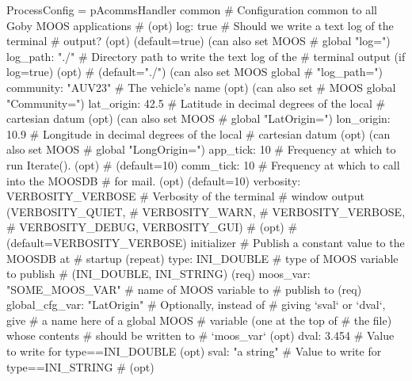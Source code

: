 \documentclass[11pt, letterpaper, oneside]{memoir}
\begin{document}
\begin{boxedverbatim}
ProcessConfig = pAcommsHandler
{
  common {  # Configuration common to all Goby MOOS applications 
            # (opt)
    log: true  # Should we write a text log of the terminal 
               # output? (opt) (default=true) (can also set MOOS 
               # global "log=")
    log_path: "./"  # Directory path to write the text log of the 
                    # terminal output (if log=true) (opt) 
                    # (default="./") (can also set MOOS global 
                    # "log_path=")
    community: "AUV23"  # The vehicle's name (opt) (can also set 
                        # MOOS global "Community=")
    lat_origin: 42.5  # Latitude in decimal degrees of the local 
                      # cartesian datum (opt) (can also set MOOS 
                      # global "LatOrigin=")
    lon_origin: 10.9  # Longitude in decimal degrees of the local 
                      # cartesian datum (opt) (can also set MOOS 
                      # global "LongOrigin=")
    app_tick: 10  # Frequency at which to run Iterate(). (opt) 
                  # (default=10)
    comm_tick: 10  # Frequency at which to call into the MOOSDB 
                   # for mail. (opt) (default=10)
    verbosity: VERBOSITY_VERBOSE  # Verbosity of the terminal 
                                  # window output (VERBOSITY_QUIET, 
                                  # VERBOSITY_WARN, 
                                  # VERBOSITY_VERBOSE, 
                                  # VERBOSITY_DEBUG, VERBOSITY_GUI) 
                                  # (opt) 
                                  # (default=VERBOSITY_VERBOSE)
    initializer {  # Publish a constant value to the MOOSDB at 
                   # startup (repeat)
      type: INI_DOUBLE  # type of MOOS variable to publish 
                        # (INI_DOUBLE, INI_STRING) (req)
      moos_var: "SOME_MOOS_VAR"  # name of MOOS variable to 
                                 # publish to (req)
      global_cfg_var: "LatOrigin"  # Optionally, instead of 
                                   # giving `sval` or `dval`, give 
                                   # a name here of a global MOOS 
                                   # variable (one at the top of 
                                   # the file) whose contents 
                                   # should be written to 
                                   # `moos_var` (opt)
      dval: 3.454  # Value to write for type==INI_DOUBLE (opt)
      sval: "a string"  # Value to write for type==INI_STRING 
                        # (opt)
    }
}}
\end{boxedverbatim}
\end{document}
